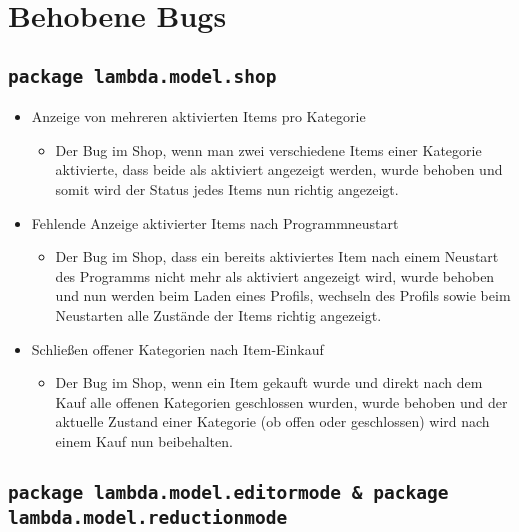 \section{Behobene Bugs}
\subsection{\texttt{package lambda.model.shop}}
\begin{itemize}
\item Anzeige von mehreren aktivierten Items pro Kategorie
\begin{itemize} 
\item Der Bug im Shop, wenn man zwei verschiedene Items einer Kategorie aktivierte, dass beide als aktiviert angezeigt werden, wurde behoben
	und somit wird der Status jedes Items nun richtig angezeigt.
	\end{itemize}
\end{itemize}

\begin{itemize}
\item Fehlende Anzeige aktivierter Items nach Programmneustart
\begin{itemize} 
\item Der Bug im Shop, dass ein bereits aktiviertes Item nach einem Neustart des Programms nicht mehr als aktiviert angezeigt wird, wurde behoben
	und nun werden beim Laden eines Profils, wechseln des Profils sowie beim Neustarten alle Zustände der Items richtig angezeigt.
	\end{itemize}
\end{itemize}

\begin{itemize}
\item Schließen offener Kategorien nach Item-Einkauf
\begin{itemize} 
\item Der Bug im Shop, wenn ein Item gekauft wurde und direkt nach dem Kauf alle offenen Kategorien geschlossen wurden, wurde behoben und
	der aktuelle Zustand einer Kategorie (ob offen oder geschlossen) wird nach einem Kauf nun beibehalten.
	\end{itemize}
\end{itemize}


\subsection{\texttt{package lambda.model.editormode \& package lambda.model.reductionmode}}

